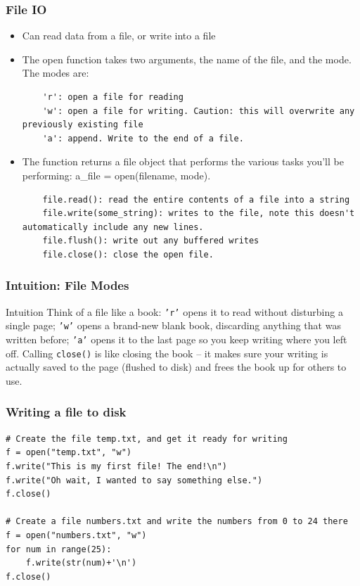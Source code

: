 \begin{frame}[fragile]\frametitle{File IO}
\begin{itemize}
\item Can read data from a file, or write into a file
\item The open function takes two arguments, the name of the file, and the mode. The modes are:
\begin{lstlisting}
    'r': open a file for reading
    'w': open a file for writing. Caution: this will overwrite any previously existing file
    'a': append. Write to the end of a file.
\end{lstlisting}
\item The function returns a file object that performs the various tasks you'll be performing: a\_file = open(filename, mode). 
\begin{lstlisting}
    file.read(): read the entire contents of a file into a string
    file.write(some_string): writes to the file, note this doesn't automatically include any new lines.
    file.flush(): write out any buffered writes
    file.close(): close the open file. 
\end{lstlisting}
\end{itemize}
\end{frame}

\begin{frame}[fragile]\frametitle{Intuition: File Modes}
\begin{block}{Intuition}
Think of a file like a book: \texttt{'r'} opens it to read without disturbing a single page;
\texttt{'w'} opens a brand-new blank book, discarding anything that was written before;
\texttt{'a'} opens it to the last page so you keep writing where you left off. Calling
\texttt{close()} is like closing the book -- it makes sure your writing is actually saved to the
page (flushed to disk) and frees the book up for others to use.
\end{block}
\end{frame}

\begin{frame}[fragile]\frametitle{Writing a file to disk}
\begin{lstlisting}
# Create the file temp.txt, and get it ready for writing
f = open("temp.txt", "w")
f.write("This is my first file! The end!\n")
f.write("Oh wait, I wanted to say something else.")
f.close()

# Create a file numbers.txt and write the numbers from 0 to 24 there
f = open("numbers.txt", "w")
for num in range(25):
    f.write(str(num)+'\n')
f.close()
\end{lstlisting}
\end{frame}


